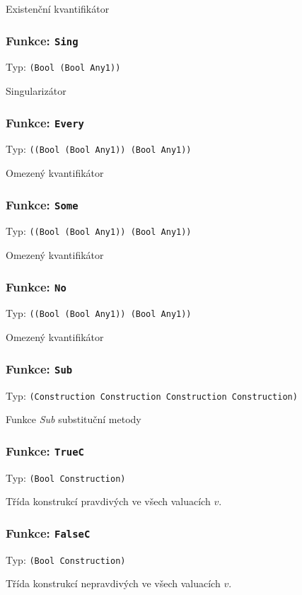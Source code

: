 Existenční kvantifikátor

\subsubsection*{Funkce: \lstinline|Sing|}
Typ: \lstinline|(Bool (Bool Any1))|

Singularizátor

\subsubsection*{Funkce: \lstinline|Every|}
Typ: \lstinline|((Bool (Bool Any1)) (Bool Any1))|

Omezený kvantifikátor

\subsubsection*{Funkce: \lstinline|Some|}
Typ: \lstinline|((Bool (Bool Any1)) (Bool Any1))|

Omezený kvantifikátor

\subsubsection*{Funkce: \lstinline|No|}
Typ: \lstinline|((Bool (Bool Any1)) (Bool Any1))|

Omezený kvantifikátor

\subsubsection*{Funkce: \lstinline|Sub|}
Typ: \lstinline|(Construction Construction Construction Construction)|

Funkce \textit{Sub} substituční metody

\subsubsection*{Funkce: \lstinline|TrueC|}
Typ: \lstinline|(Bool Construction)|

Třída konstrukcí pravdivých ve všech valuacích $v$.

\subsubsection*{Funkce: \lstinline|FalseC|}
Typ: \lstinline|(Bool Construction)|

Třída konstrukcí nepravdivých ve všech valuacích $v$.

